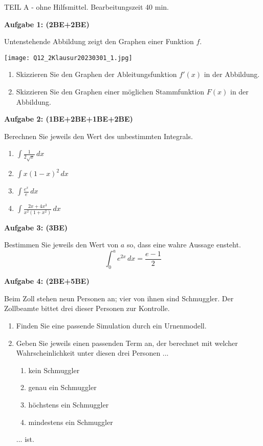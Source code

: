 \documentclass[a4paper,12pt]{article}
\newcommand{\Aufgabe}[1]{
  {
  \vspace*{0.5cm}
  \textsf{\textbf{Aufgabe #1}}
  \vspace*{0.2cm}
  
  }
}
\begin{document}
\vspace{0.3cm}
\newpage\null\thispagestyle{empty}\newpage
\newpage
\vspace{1,5cm} {TEIL A} - ohne Hilfsmittel. Bearbeitungszeit 40 min.
\vspace {0,2cm}

\Aufgabe{1: (2BE+2BE)} %

Untenstehende Abbildung zeigt den Graphen einer Funktion $f$.
\begin{center}
\texttt{[image: Q12\_2Klausur20230301\_1.jpg]}
\end{center}
\begin{enumerate}[label={\alph*)}]
  \item Skizzieren Sie den Graphen der Ableitungsfunktion $f'(x)$ in der Abbildung.
  \item Skizzieren Sie den Graphen einer möglichen Stammfunktion $F(x)$ in der Abbildung.
\end{enumerate}

\Aufgabe{2: (1BE+2BE+1BE+2BE)} %
Berechnen Sie jeweils den Wert des unbestimmten Integrals.

\begin{enumerate}[label={\alph*)}]
  \item $\int \frac{1}{2\sqrt{x}}\, dx$
  \item $\int x(1-x)^2\, dx$
  \item $\int \frac{e^x}{e}\, dx$
  \item $\int \frac{2x+4x^3}{x^2(1+x^2)}\, dx$
\end{enumerate}

\Aufgabe{3: (3BE)}
Bestimmen Sie jeweils den Wert von $a$ so, dass eine wahre Aussage ensteht.
\[ \int_0^a e^{2x}\, dx = \frac{e-1}{2} \]

\newpage
\Aufgabe{4: (2BE+5BE)} %
Beim Zoll stehen neun Personen an; vier von ihnen sind Schmuggler. Der Zollbeamte bittet drei dieser Personen zur Kontrolle.
  \begin{enumerate}[label={\alph*)}]
    \item Finden Sie eine passende Simulation durch ein Urnenmodell.
    \item Geben Sie jeweils einen passenden Term an, der berechnet mit welcher Wahrscheinlichkeit unter diesen drei Personen ...
      \begin{enumerate}[label={(\arabic*)}]
        \item kein Schmuggler
        \item genau ein Schmuggler
        \item höchstens ein Schmuggler
        \item mindestens ein Schmuggler
      \end{enumerate}
 ... ist.
  \end{enumerate}
\end{document}
